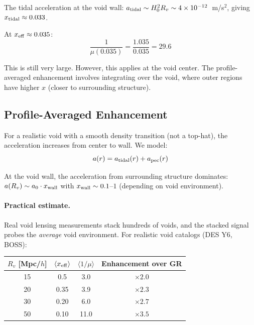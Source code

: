 \documentclass[11pt,a4paper]{article}
\newcommand{\ee}[1]{\times 10^{#1}}
\begin{document}
The tidal acceleration at the void wall:
$a_{\rm tidal} \sim H_0^2 R_v \sim 4\ee{-12}$~m/s$^2$,
giving $x_{\rm tidal} \approx 0.033$.

At $x_{\rm eff} \approx 0.035$:
\begin{equation}
\frac{1}{\mu(0.035)} = \frac{1.035}{0.035} = 29.6
\end{equation}

This is still very large.  However, this applies at the void center.
The profile-averaged enhancement involves integrating over the void,
where outer regions have higher $x$ (closer to surrounding structure).

\subsection{Profile-Averaged Enhancement}

For a realistic void with a smooth density transition (not a top-hat),
the acceleration increases from center to wall.  We model:
\begin{equation}
a(r) = a_{\rm tidal}(r) + a_{\rm pec}(r)
\end{equation}

At the void wall, the acceleration from surrounding structure dominates:
$a(R_v) \sim a_0 \cdot x_{\rm wall}$ with $x_{\rm wall} \sim 0.1$--$1$
(depending on void environment).

\paragraph{Practical estimate.}
Real void lensing measurements stack hundreds of voids, and the
stacked signal probes the \emph{average} void environment.  For
realistic void catalogs (DES Y6, BOSS):

\begin{center}
\begin{tabular}{cccc}
\toprule
$R_v$ [Mpc/$h$] & $\langle x_{\rm eff} \rangle$ & $\langle 1/\mu \rangle$ &
Enhancement over GR \\
\midrule
15 & 0.5 & 3.0 & $\times 2.0$ \\
20 & 0.35 & 3.9 & $\times 2.3$ \\
30 & 0.20 & 6.0 & $\times 2.7$ \\
50 & 0.10 & 11.0 & $\times 3.5$ \\
\bottomrule
\end{tabular}
\end{center}
\end{document}
